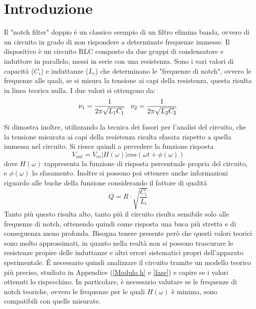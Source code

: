 \documentclass[leqno]{article}
\begin{document}
	
	\section{Introduzione}
	Il "notch filter" doppio è un classico esempio di un filtro elimina banda, ovvero di un circuito in grado di non rispondere a determinate frequenze immesse. Il dispositivo è un circuito RLC composto da due gruppi di condensatore e induttore in parallelo, messi in serie con una resistenza. Sono i vari valori di capacità ($C_i$) e induttanze ($L_i$) che determinano le "frequenze di notch", ovvero le frequenze alle quali, se si misura la tensione ai capi della resistenza, questa risulta in linea teorica nulla. I due valori si ottengono da:
	\begin{equation}
		\nu_1 = \frac{1}{2\pi \sqrt{L_1 C_1}  } \; \; \;  
		\nu_2 = \frac{1}{2\pi \sqrt{L_2 C_2}  }
		\label{Freq. notch}
		\numberwithin{equation}{section}
	\end{equation}
	
	Si dimostra inoltre, utilizzando la tecnica dei fasori per l'analisi del circuito,
	che la tensione misurata ai capi della resistenza risulta sfasata rispetto a quella immessa nel circuito.
	Si riesce quindi a prevedere la funzione risposta
	\begin{equation}
		\label{Tensione uscente}
		V_{out} = V_{in} |H(\omega)| cos(\omega t + \phi(\omega)) 
	\end{equation}
	dove $H(\omega)$ rappresenta la funzione di risposta percentuale propria del circuito, e $\phi(\omega)$ lo sfasamento.
	Inoltre si possono poi ottenere anche informazioni riguardo alle buche della funzione considerando il fattore di qualità 
	\begin{equation}
		\label{qualità}
		Q = R\cdot \sqrt{\frac{C_i}{L_i}}
	\end{equation}
	Tanto più questo risulta alto, tanto più il circuito risulta sensibile solo alle frequenze di notch, ottenendo quindi come risposta una buca più stretta e di conseguenza meno profonda.
	Bisogna tenere presente però che questi valori teorici sono molto approssimati, in quanto nella realtà non si possono trascurare le resistenze propire delle induttanze e altri errori sistematici propri dell'apparato sperimentale. \'E necessario quindi analizzare il circuito tramite un modello teorico più preciso, studiato in Appendice (\ref{Modulo h} e \ref{fase})
	e capire se i valori ottenuti lo rispecchino. 
	In particolare, è necessario valutare se le frequenze di notch teoriche, ovvero le frequenze per le quali $H(\omega)$ è minima, sono compatibili con quelle misurate.
	
\end{document}
